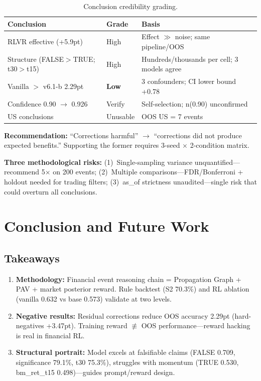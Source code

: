 \documentclass[sigconf, anonymous, review]{acmart}
\begin{document}
\begin{table}[t]
\centering\small
\caption{Conclusion credibility grading.}
\label{tab:audit}
\begin{tabular}{@{}lll@{}}
\toprule
Conclusion & Grade & Basis \\
\midrule
RLVR effective (+5.9pt) & High & Effect $\gg$ noise; same pipeline/OOS \\
Structure (FALSE$>$TRUE; t30$>$t15) & High & Hundreds/thousands per cell; 3 models agree \\
Vanilla $>$ v6.1-b 2.29pt & \textbf{Low} & 3 confounders; CI lower bound +0.78 \\
Confidence 0.90 $\to$ 0.926 & Verify & Self-selection; n(0.90) unconfirmed \\
US conclusions & Unusable & OOS US = 7 events \\
\bottomrule
\end{tabular}
\end{table}

\textbf{Recommendation:} ``Corrections harmful'' $\to$ ``corrections did not produce expected benefits.'' Supporting the former requires 3-seed $\times$ 2-condition matrix.

\textbf{Three methodological risks:} (1)~Single-sampling variance unquantified---recommend 5$\times$ on 200 events; (2)~Multiple comparisons---FDR/Bonferroni + holdout needed for trading filters; (3)~as\_of strictness unaudited---single risk that could overturn all conclusions.

\section{Conclusion and Future Work}

\subsection{Takeaways}

\begin{enumerate}
    \item \textbf{Methodology:} Financial event reasoning chain = Propagation Graph + PAV + market posterior reward. Rule backtest (S2 70.3\%) and RL ablation (vanilla 0.632 vs base 0.573) validate at two levels.
    \item \textbf{Negative results:} Residual corrections reduce OOS accuracy 2.29pt (hard-negatives +3.47pt). Training reward $\not\equiv$ OOS performance---reward hacking is real in financial RL.
    \item \textbf{Structural portrait:} Model excels at falsifiable claims (FALSE 0.709, significance 79.1\%, t30 75.3\%), struggles with momentum (TRUE 0.530, bm\_ret\_t15 0.498)---guides prompt/reward design.
\end{enumerate}
\end{document}
